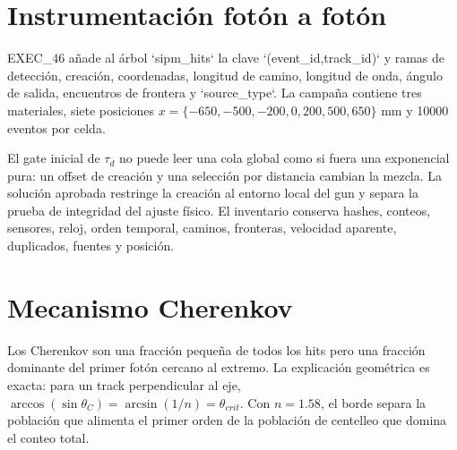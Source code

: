 
\chapter{Instrumentación fotón a fotón}
EXEC\_46 añade al árbol `sipm\_hits` la clave `(event\_id,track\_id)` y ramas de detección, creación, coordenadas, longitud de camino, longitud de onda, ángulo de salida, encuentros de frontera y `source\_type`. La campaña contiene tres materiales, siete posiciones $x=\{-650,-500,-200,0,200,500,650\}$ mm y 10000 eventos por celda.


El gate inicial de $\tau_d$ no puede leer una cola global como si fuera una exponencial pura: un offset de creación y una selección por distancia cambian la mezcla. La solución aprobada restringe la creación al entorno local del gun y separa la prueba de integridad del ajuste físico. El inventario conserva hashes, conteos, sensores, reloj, orden temporal, caminos, fronteras, velocidad aparente, duplicados, fuentes y posición.

\chapter{Mecanismo Cherenkov}
Los Cherenkov son una fracción pequeña de todos los hits pero una fracción dominante del primer fotón cercano al extremo. La explicación geométrica es exacta: para un track perpendicular al eje, $\arccos(\sin\theta_C)=\arcsin(1/n)=\theta_{crit}$. Con $n=1.58$, el borde separa la población que alimenta el primer orden de la población de centelleo que domina el conteo total.

